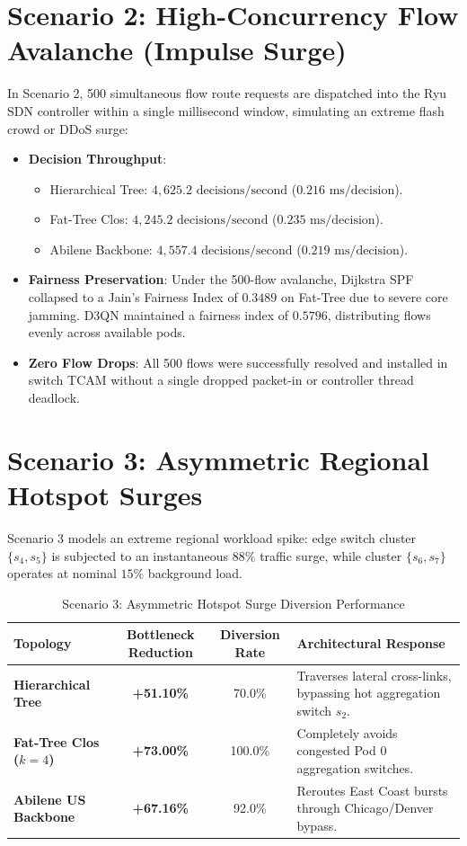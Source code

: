 \documentclass[12pt,a4paper,oneside]{report}
\begin{document}
\section{Scenario 2: High-Concurrency Flow Avalanche (Impulse Surge)}
In Scenario 2, 500 simultaneous flow route requests are dispatched into the Ryu SDN controller within a single millisecond window, simulating an extreme flash crowd or DDoS surge:
\begin{itemize}
    \item \textbf{Decision Throughput}:
    \begin{itemize}
        \item Hierarchical Tree: \textbf{$4,625.2\text{ decisions/second}$} ($0.216\text{ ms/decision}$).
        \item Fat-Tree Clos: \textbf{$4,245.2\text{ decisions/second}$} ($0.235\text{ ms/decision}$).
        \item Abilene Backbone: \textbf{$4,557.4\text{ decisions/second}$} ($0.219\text{ ms/decision}$).
    \end{itemize}
    \item \textbf{Fairness Preservation}: Under the 500-flow avalanche, Dijkstra SPF collapsed to a Jain's Fairness Index of $0.3489$ on Fat-Tree due to severe core jamming. D3QN maintained a fairness index of \textbf{$0.5796$}, distributing flows evenly across available pods.
    \item \textbf{Zero Flow Drops}: All 500 flows were successfully resolved and installed in switch TCAM without a single dropped packet-in or controller thread deadlock.
\end{itemize}

\section{Scenario 3: Asymmetric Regional Hotspot Surges}
Scenario 3 models an extreme regional workload spike: edge switch cluster $\{s_4, s_5\}$ is subjected to an instantaneous $88\%$ traffic surge, while cluster $\{s_6, s_7\}$ operates at nominal $15\%$ background load.

\begin{table}[htbp]
\centering
\caption{Scenario 3: Asymmetric Hotspot Surge Diversion Performance}
\label{tab:stress_scenario_3}
\small
\begin{tabularx}{\textwidth}{l c c X}
\toprule
\textbf{Topology} & \textbf{Bottleneck Reduction} & \textbf{Diversion Rate} & \textbf{Architectural Response} \\
\midrule
\textbf{Hierarchical Tree} & \textbf{+51.10\%} & 70.0\% & Traverses lateral cross-links, bypassing hot aggregation switch $s_2$. \\
\textbf{Fat-Tree Clos ($k=4$)} & \textbf{+73.00\%} & 100.0\% & Completely avoids congested Pod 0 aggregation switches. \\
\textbf{Abilene US Backbone} & \textbf{+67.16\%} & 92.0\% & Reroutes East Coast bursts through Chicago/Denver bypass. \\
\bottomrule
\end{tabularx}
\end{table}
\end{document}
